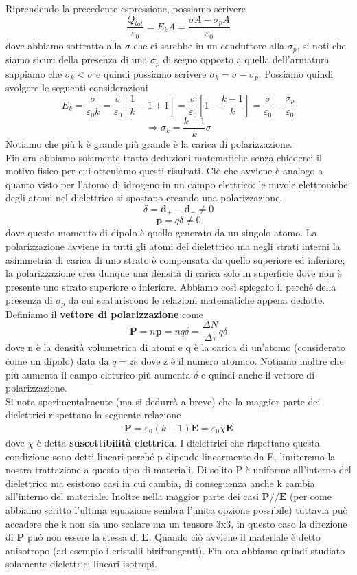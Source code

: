 \documentclass[
10pt, %
a4paper, %
oneside, %
headinclude,footinclude, %
BCOR5mm, %
]{scrartcl}
\begin{document}
Riprendendo la precedente espressione, possiamo scrivere
 \[\frac{Q_{tot}}{\varepsilon_0} = E_k A = \frac{\sigma A - \sigma_p A}{\varepsilon_0}\]
dove abbiamo sottratto alla $\sigma$ che ci sarebbe in un conduttore alla $\sigma_p$, si noti che siamo sicuri della presenza di una $\sigma_p$ di segno opposto a quella dell'armatura  sappiamo che \(\sigma_k<\sigma\) e quindi possiamo scrivere \(\sigma_k = \sigma -\sigma_p\). Possiamo quindi svolgere le seguenti considerazioni
\[E_k = \frac{\sigma }{\varepsilon_0 k} = \frac{\sigma}{\varepsilon_0}\left[\frac{1}{k}-1+1\right] = \frac{\sigma}{\varepsilon_0}\left[1-\frac{k-1}{k}\right] = \frac{\sigma}{\varepsilon_0}-\frac{\sigma_p}{\varepsilon_0}\]
\[\Rightarrow \sigma_k = \frac{k-1}{k}\sigma\]
Notiamo che più k è grande più grande è la carica di polarizzazione.\\
Fin ora abbiamo solamente tratto deduzioni matematiche senza chiederci il motivo fisico per cui otteniamo questi risultati. Ciò che avviene è analogo a quanto visto per l'atomo di idrogeno in un campo elettrico: le nuvole elettroniche degli atomi nel dielettrico si spostano creando una polarizzazione. 
\[\delta = \mathbf{d}_+ -\mathbf{d}_- \neq 0\]
\[\mathbf{p} = q\delta\neq 0\]
dove questo momento di dipolo è quello generato da un singolo atomo. La polarizzazione avviene in tutti gli atomi del dielettrico ma negli strati interni la asimmetria di carica di uno strato è compensata da quello superiore ed inferiore; la polarizzazione crea dunque una densità di carica solo in superficie dove non è presente uno strato superiore o inferiore. Abbiamo così spiegato il perché della presenza di \(\sigma_p\) da cui scaturiscono le relazioni matematiche appena dedotte. Definiamo il \textbf{vettore di polarizzazione} come
\[\mathbf{P} = n\mathbf{p} = nq\delta = \frac{\Delta N}{\Delta \tau} q \delta \]  
dove n è la densità volumetrica di atomi e q è la carica di un'atomo (considerato come un dipolo) data da \(q = ze\) dove z è il numero atomico. Notiamo inoltre che più aumenta il campo elettrico più aumenta $\delta$ e quindi anche il vettore di polarizzazione.\\
Si nota sperimentalmente (ma si dedurrà a breve) che la maggior parte dei dielettrici rispettano la seguente relazione
\begin{align}\label{eq:polarizzazione_lineare}
	\mathbf{P} = \varepsilon_0(k-1)\mathbf{E} = \varepsilon_0 \chi \mathbf{E}
\end{align}
dove $\chi$ è detta \textbf{suscettibilità elettrica}. I dielettrici che rispettano questa condizione sono detti lineari perché p dipende linearmente da E, limiteremo la nostra trattazione a questo tipo di materiali. Di solito P è uniforme all'interno del dielettrico ma esistono casi in cui cambia, di conseguenza anche k cambia all'interno del materiale. Inoltre nella maggior parte dei casi \(\mathbf{P} // \mathbf{E}\) (per come abbiamo scritto l'ultima equazione sembra l'unica opzione possibile) tuttavia può accadere che k non sia uno scalare ma un tensore 3x3, in questo caso la direzione di $\mathbf{P}$ può non essere la stessa di $\mathbf{E}$. Quando ciò avviene il materiale è detto anisotropo (ad esempio i cristalli birifrangenti). Fin ora abbiamo quindi studiato solamente dielettrici lineari isotropi.
\end{document}
